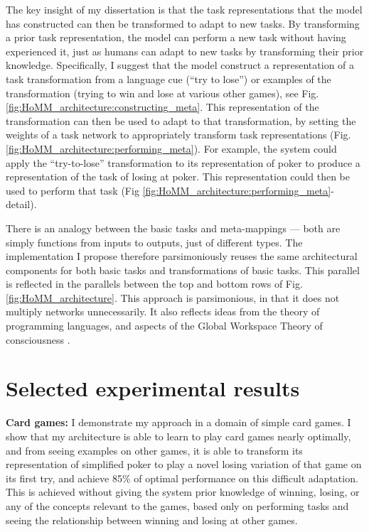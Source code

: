 \documentclass[12pt]{article}
\begin{document}
The key insight of my dissertation is that the task representations that the model has constructed can then be transformed to adapt to new tasks. By transforming a prior task representation, the model can perform a new task without having experienced it, just as humans can adapt to new tasks by transforming their prior knowledge. Specifically, I suggest that the model construct a representation of a task transformation from a language cue (``try to lose'') or examples of the transformation (trying to win and lose at various other games), see Fig. \ref{fig:HoMM_architecture:constructing_meta}. This representation of the transformation can then be used to adapt to that transformation, by setting the weights of a task network to appropriately transform task representations (Fig. \ref{fig:HoMM_architecture:performing_meta}). For example, the system could apply the ``try-to-lose'' transformation to its representation of poker to produce a representation of the task of losing at poker. This representation could then be used to perform that task (Fig \ref{fig:HoMM_architecture:performing_meta}-detail). 

There is an analogy between the basic tasks and meta-mappings --- both are simply functions from inputs to outputs, just of different types. The implementation I propose therefore parsimoniously reuses the same architectural components for both basic tasks and transformations of basic tasks. This parallel is reflected in the parallels between the top and bottom rows of Fig. \ref{fig:HoMM_architecture}. This approach is parsimonious, in that it does not multiply networks unnecessarily. It also reflects ideas from the theory of programming languages, and aspects of the Global Workspace Theory of consciousness \citep{Baars2005}. 

\section{Selected experimental results}
\textbf{Card games:} I demonstrate my approach in a domain of simple card games. I show that my architecture is able to learn to play card games nearly optimally, and from seeing examples on other games, it is able to transform its representation of simplified poker to play a novel losing variation of that game on its first try, and achieve 85\% of optimal performance on this difficult adaptation. This is achieved without giving the system prior knowledge of winning, losing, or any of the concepts relevant to the games, based only on performing tasks and seeing the relationship between winning and losing at other games.
\end{document}
